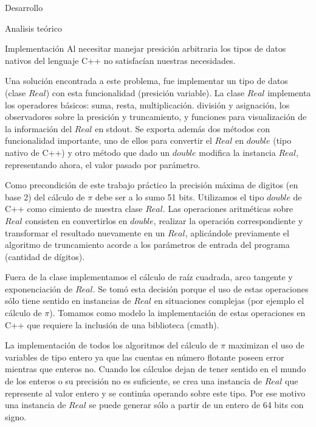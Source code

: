 \begin{section}{Desarrollo}
\begin{subsection}{Analisis teórico}
		
		\newpage
		
		\newpage
		
		
	\end{subsection}
	\begin{subsection}{Implementación}
		Al necesitar manejar presición arbitraria los tipos de datos nativos del lenguaje C++ no satisfacían nuestras necesidades.
		
		Una solución encontrada a este problema, fue implementar un tipo de datos (clase $Real$) con esta funcionalidad (presición variable). La clase $Real$ implementa los operadores básicos: suma, resta, multiplicación. división y asignación, los observadores sobre la presición y truncamiento, y funciones para visualización de la información del $Real$ en stdout. Se exporta además dos métodos con funcionalidad importante, uno de ellos para convertir el $Real$ en $double$ (tipo nativo de C++) y otro método que dado un $double$ modifica la instancia $Real$, representando ahora, el valor pasado por parámetro.
		
		Como precondición de este trabajo práctico la precisión máxima de digitos (en base 2) del cálculo de $\pi$ debe ser a lo sumo 51 bits.
		Utilizamos el tipo $double$ de C++ como cimiento de nuestra clase $Real$. Las operaciones aritméticas sobre $Real$ consisten en convertirlos en $double$, realizar la operación correspondiente y transformar el resultado nuevamente en un $Real$, aplicándole previamente el algoritmo de truncamiento
		acorde a los parámetros de entrada del programa (cantidad de dígitos).
		
		Fuera de la clase implementamos el cálculo de raíz cuadrada, arco tangente y exponenciación de $Real$. Se tomó esta decisión porque el uso de estas operaciones sólo tiene sentido en instancias de $Real$ en situaciones complejas (por ejemplo el cálculo de $\pi$). Tomamos como modelo la implementación de estas operaciones en C++ que requiere la inclusión de una biblioteca (cmath).
		
		La implementación de todos los algoritmos del cálculo de $\pi$ maximizan el uso de variables de tipo entero ya que las cuentas en número flotante poseen error mientras que enteros no. Cuando los cálculos dejan de tener sentido en el mundo de los enteros o su precisión no es suficiente, se crea una instancia de $Real$ que represente al valor entero y se continúa operando sobre este tipo. Por ese motivo una instancia de $Real$ se puede generar sólo a partir de un entero de 64 bits con signo.\\
		

\end{subsection}
\end{section}
